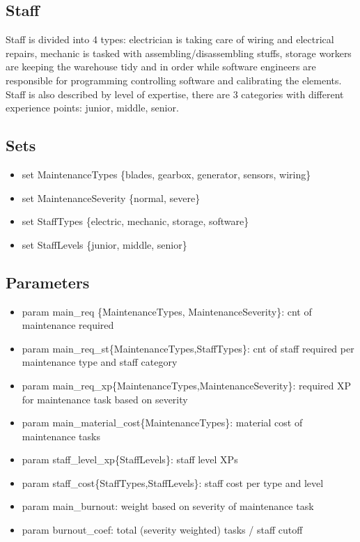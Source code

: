     \subsection{Staff}
      Staff is divided into 4 types: electrician is taking care of wiring and electrical repairs, 
      mechanic is tasked with assembling/disassembling stuffs, storage workers are keeping 
      the warehouse tidy and in order while software engineers are responsible for 
      programming controlling software and calibrating the elements. Staff is also described by 
      level of expertise, there are 3 categories with different experience points: junior, middle, senior.

    \subsection{Sets}
      \begin{itemize}
        \item set MaintenanceTypes \{blades, gearbox, generator, sensors, wiring\}
        \item set MaintenanceSeverity \{normal, severe\}
        \item set StaffTypes \{electric, mechanic, storage, software\}
        \item set StaffLevels \{junior, middle, senior\}
      \end{itemize}

    \subsection{Parameters}
      \begin{itemize}
        \item param main\_req \{MaintenanceTypes, MaintenanceSeverity\}: cnt of maintenance required
        \item param main\_req\_st\{MaintenanceTypes,StaffTypes\}: cnt of staff required per maintenance type and staff category
        \item param main\_req\_xp\{MaintenanceTypes,MaintenanceSeverity\}: required XP for maintenance task based on severity
        \item param main\_material\_cost\{MaintenanceTypes\}: material cost of maintenance tasks
        \item param staff\_level\_xp\{StaffLevels\}: staff level XPs
        \item param staff\_cost\{StaffTypes,StaffLevels\}: staff cost per type and level
        \item param main\_burnout: weight based on severity of maintenance task
        \item param burnout\_coef: total (severity weighted) tasks / staff cutoff
      \end{itemize}

